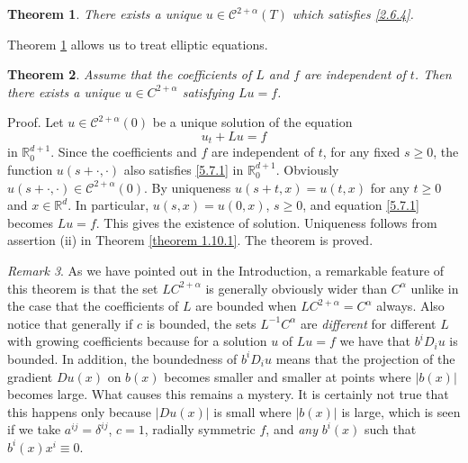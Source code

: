 \documentclass[reqno,12pt]{amsart}
\newtheorem{theorem}{Theorem}[section]
\theoremstyle{definition}
\theoremstyle{remark}
\newtheorem{remark}[theorem]{Remark}
\begin{document}
\begin{theorem}
                                              \label{theorem 2.7.1}
There exists a unique $u\in {\mathcal{C}}^{2+\alpha}(T)$ which satisfies
\eqref{2.6.4}.

\end{theorem}

   Theorem \ref{theorem 2.7.1} allows us to treat elliptic
equations.
\begin{theorem}
                                       \label{5.7.2}
Assume that the coefficients of $L$ and $f$ are independent of
$t$. Then there exists a unique $u\in C^{2+\alpha} $ satisfying $
Lu=f$.

\end{theorem}

   Proof. Let $u\in{\mathcal{C}}^{2+\alpha}(0)$ be a unique solution
of the equation
\begin{equation}
                                                   \label{5.7.1}
u_{t}+Lu =f
\end{equation}
in ${\mathbb{R}}^{d+1}_{0}$.  Since the coefficients and $f$ are
independent of $t$, for any fixed $s\geq0$, the function
   $u(s+\cdot , \cdot)$
   also satisfies \eqref{5.7.1} in ${\mathbb{R}}^{d+1}_{0}$.
Obviously $u(s+\cdot,\cdot) \in{\mathcal{C}}^{2+\alpha}(0)$. By uniqueness
$u(s+t,x)=u(t,x)$ for any $t\geq0$ and $x\in{\mathbb{R}}^{d}$. In
particular, $u(s,x)=u(0,x)$,   $s \ge 0$,  and equation
\eqref{5.7.1} becomes $Lu=f$. This gives the existence of
solution. Uniqueness follows from assertion (ii) in   Theorem
\ref{theorem 1.10.1}. The theorem is proved.

   \begin{remark} \label{new}
   As we have pointed out in the Introduction,    a remarkable
feature of this theorem is that the set $LC^{2+\alpha}$ is
generally obviously wider than $C^{\alpha}$ unlike in the case
that the coefficients of $L$ are bounded   when
$LC^{2+\alpha}=C^{\alpha}$ always. Also notice that generally if
$c$ is bounded, the sets $L^{-1}C^{\alpha}$ are {\em different\/}
for different $L$ with growing coefficients because for a solution
$u$ of $Lu=f$ we have that $b^{i}D_{i}u$ is bounded. In addition,
the boundedness of $b^{i}D_{i}u$ means that the projection of the
gradient
    $Du(x)$  on $b(x)$    becomes smaller and smaller
   at points where $|b(x)|$ becomes large.
    What causes this
remains a mystery. It is certainly not true that this happens only
because $|Du(x)|$ is small where $|b(x)|$ is large, which is seen
if we take $a^{ij}=\delta^{ij}$, $c=1$, radially symmetric $f$,
and {\em any\/} $b^{i}(x)$ such that $b^{i}(x)x^{i}\equiv0$.
\end{remark}
\end{document}
